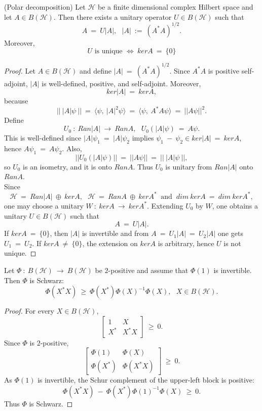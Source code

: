 \documentclass[11pt,a4paper]{article}
\begin{document}
    \pagebreak
    \begin{theorem}
    \label{a_theorem}
    (Polar decomposition) Let $\mathcal{H}$ be a finite dimensional complex Hilbert space and let $A \in B(\mathcal{H})$. Then there exists a unitary operator $U \in B(\mathcal{H})$ such that $$A\ =\ U|A|,\ \ \ |A|\ :=\ (A^*A)^{1/2}.$$ Moreover, $$U \text{ is unique } \Leftrightarrow\ kerA\ =\ \{0\}$$
    \end{theorem}
    \begin{proof}
    Let $A \in B(\mathcal{H})$ and define $|A|\ =\ (A^*A)^{1/2}$. Since $A^*A$ is positive self-adjoint, $|A|$ is well-defined, positive, and self-adjoint. Moreover, $$ker|A|\ =\ kerA,$$ because $$||\ |A|\psi\ ||\ =\ \langle \psi,\ |A|^2\psi\rangle\ =\ \langle \psi,\ A^*A \psi\rangle\ =\ ||A\psi||^2.$$ Define $$U_0\ :\ Ran|A|\ \rightarrow\ RanA,\ \ \ U_0(|A|\psi)\ =\ A\psi.$$ This is well-defined since $|A|\psi_1\ =\ |A|\psi_2$ implies $\psi_1\ -\ \psi_2 \in ker|A|\ =\ kerA$, hence $A\psi_1\ =\ A\psi_2$. Also, $$||U_0(|A|\psi)||\ =\ ||A\psi||\ =\ ||\ |A|\psi\ ||,$$ so $U_0$ is an isometry, and it is onto $RanA$. Thus $U_0$ is unitary from $Ran|A|$ onto $RanA$.\\ Since $$\mathcal{H}\ =\ Ran|A|\ \oplus\ kerA,\ \ \ \mathcal{H}\ =\ RanA\ \oplus\ kerA^*\  \text{ and }\ dim\ kerA\ =\ dim\ kerA^*,$$ one may choose a unitary $W\ :\ kerA\  \rightarrow\ kerA^*$. Extending $U_0$ by $W$, one obtains a unitary $U \in B(\mathcal{H})$ such that $$A\ =\ U|A|.$$ If $kerA\ =\ \{0\}$, then $|A|$ is invertible and from $A\ =\ U_1|A|\ =\ U_2|A|$ one gets $U_1\ =\ U_2$. If $kerA\ \neq\ \{0\}$, the extension on $kerA$ is arbitrary, hence $U$ is not unique.
    \end{proof}
    \vspace{0.3cm} %

    \begin{proposition}
    Let $\Phi\ :\ B(\mathcal{H})\ \rightarrow\ B(\mathcal{H})$ be $2$-positive and assume that $\Phi(1)$ is invertible. Then $\Phi$ is Schwarz: $$\Phi(X^*X)\ \geq\ \Phi(X^*)\Phi(X)^{-1}\Phi(X),\ \ \ X \in B(\mathcal{H}).$$
    \end{proposition}
    \begin{proof} 
    For every $X \in B(\mathcal{H})$, $$ \begin{bmatrix} 1 & X \\ X^* & X^*X \end{bmatrix}\ \geq\ 0.$$ Since $\Phi$ is $2$-positive, $$\begin{bmatrix} \Phi(1) & \Phi(X) \\ \Phi(X^*) & \Phi(X^*X) \end{bmatrix}\ \geq\ 0.$$ As $\Phi(1)$ is invertible, the Schur complement of the upper-left block is positive: $$\Phi(X^*X)\ -\ \Phi(X^*)\Phi(1)^{-1}\Phi(X)\ \geq\ 0.$$ Thus $\Phi$ is Schwarz.
    \end{proof}
    \vspace{0.3cm} %
\end{document}
